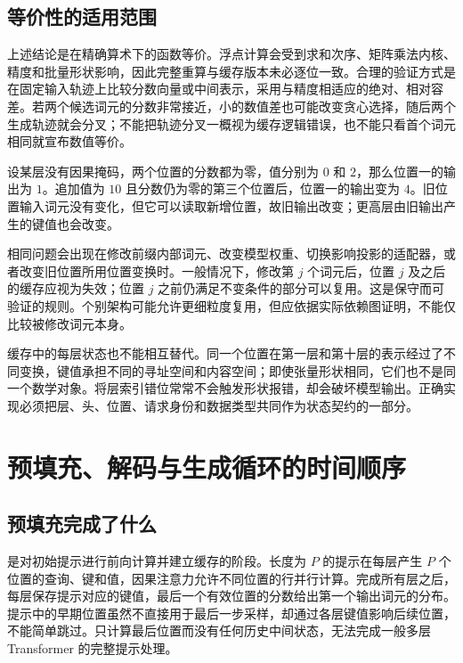 \documentclass[UTF8,12pt,a4paper,fontset=fandol]{ctexart}
\begin{document}
\subsection{等价性的适用范围}

上述结论是在精确算术下的函数等价。浮点计算会受到求和次序、矩阵乘法内核、精度和批量形状影响，因此完整重算与缓存版本未必逐位一致。合理的验证方式是在固定输入轨迹上比较分数向量或中间表示，采用与精度相适应的绝对、相对容差。若两个候选词元的分数非常接近，小的数值差也可能改变贪心选择，随后两个生成轨迹就会分叉；不能把轨迹分叉一概视为缓存逻辑错误，也不能只看首个词元相同就宣布数值等价。

\begin{example}[双向注意力不能直接沿用同样的证明]
设某层没有因果掩码，两个位置的分数都为零，值分别为 $0$ 和 $2$，那么位置一的输出为 $1$。追加值为 $10$ 且分数仍为零的第三个位置后，位置一的输出变为 $4$。旧位置输入词元没有变化，但它可以读取新增位置，故旧输出改变；更高层由旧输出产生的键值也会改变。
\end{example}

相同问题会出现在修改前缀内部词元、改变模型权重、切换影响投影的适配器，或者改变旧位置所用位置变换时。一般情况下，修改第 $j$ 个词元后，位置 $j$ 及之后的缓存应视为失效；位置 $j$ 之前仍满足不变条件的部分可以复用。这是保守而可验证的规则。个别架构可能允许更细粒度复用，但应依据实际依赖图证明，不能仅比较被修改词元本身。

缓存中的每层状态也不能相互替代。同一个位置在第一层和第十层的表示经过了不同变换，键值承担不同的寻址空间和内容空间；即使张量形状相同，它们也不是同一个数学对象。将层索引错位常常不会触发形状报错，却会破坏模型输出。正确实现必须把层、头、位置、请求身份和数据类型共同作为状态契约的一部分。

\section{预填充、解码与生成循环的时间顺序}
\label{sec:kv-phases}

\subsection{预填充完成了什么}

是对初始提示进行前向计算并建立缓存的阶段。长度为 $P$ 的提示在每层产生 $P$ 个位置的查询、键和值，因果注意力允许不同位置的行并行计算。完成所有层之后，每层保存提示对应的键值，最后一个有效位置的分数给出第一个输出词元的分布。提示中的早期位置虽然不直接用于最后一步采样，却通过各层键值影响后续位置，不能简单跳过。只计算最后位置而没有任何历史中间状态，无法完成一般多层 Transformer 的完整提示处理。
\end{document}
